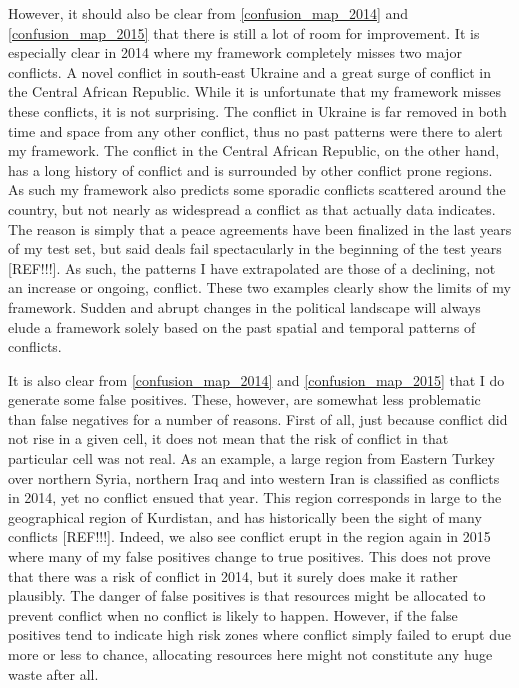 \documentclass[a4paper]{article}
\begin{document}
However, it should also be clear from \autoref{confusion_map_2014} and \autoref{confusion_map_2015} that there is still a lot of room for improvement. It is especially clear in 2014 where my framework completely misses two major conflicts. A novel conflict in south-east Ukraine and a great surge of conflict in the Central African Republic. While it is unfortunate that my framework misses these conflicts, it is not surprising. The conflict in Ukraine is far removed in both time and space from any other conflict, thus no past patterns were there to alert my framework. The conflict in the Central African Republic, on the other hand, has a long history of conflict and is surrounded by other conflict prone regions. As such my framework also predicts some sporadic conflicts scattered around the country, but not nearly as widespread a conflict as that actually data indicates. The reason is simply that a peace agreements have been finalized in the last years of my test set, but said deals fail spectacularly in the beginning of the test years [REF!!!]. As such, the patterns I have extrapolated are those of a declining, not an increase or ongoing, conflict. These two examples clearly show the limits of my framework. Sudden and abrupt changes in the political landscape will always elude a framework solely based on the past spatial and temporal patterns of conflicts.\par

It is also clear from \autoref{confusion_map_2014} and \autoref{confusion_map_2015} that I do generate some false positives. These, however, are somewhat less problematic than false negatives for a number of reasons. First of all, just because conflict did not rise in a given cell, it does not mean that the risk of conflict in that particular cell was not real. As an example, a large region from Eastern Turkey over northern Syria, northern Iraq and into western Iran is classified as conflicts in 2014, yet no conflict ensued that year. This region corresponds in large to the geographical region of Kurdistan, and has historically been the sight of many conflicts [REF!!!].  Indeed, we also see conflict erupt in the region again in 2015 where many of my false positives change to true positives. This does not prove that there was a risk of conflict in 2014, but it surely does make it rather plausibly. The danger of false positives is that resources might be allocated to prevent conflict when no conflict is likely to happen. However, if the false positives tend to indicate high risk zones where conflict simply failed to erupt due more or less to chance, allocating resources here might not constitute any huge waste after all.\par
\end{document}
